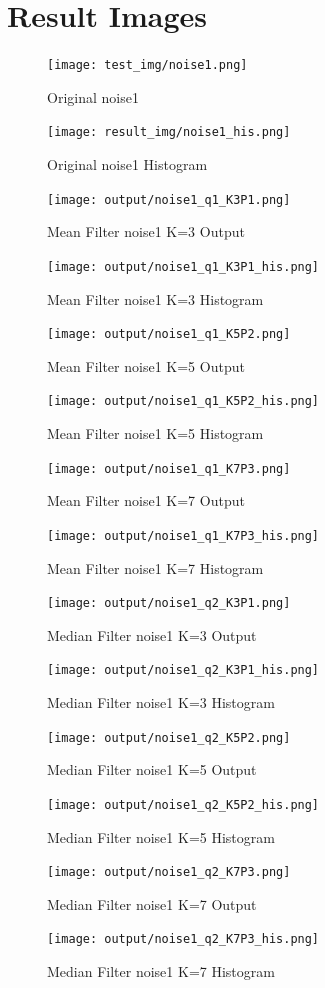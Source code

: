 \documentclass[12pt,a4paper]{report}
\begin{document}
\chapter{Result Images}
\begin{figure}[!htb]
  \centering
  \texttt{[image: test\_img/noise1.png]}
  \caption{Original noise1}
  \texttt{[image: result\_img/noise1\_his.png]}
  \caption{Original noise1 Histogram}
\end{figure}
\begin{figure}[!htb]
  \texttt{[image: output/noise1\_q1\_K3P1.png]}
  \caption{Mean Filter noise1 K=3 Output}
  \texttt{[image: output/noise1\_q1\_K3P1\_his.png]}
  \caption{Mean Filter noise1 K=3 Histogram}
\end{figure}
\begin{figure}[!htb]
  \texttt{[image: output/noise1\_q1\_K5P2.png]}
  \caption{Mean Filter noise1 K=5 Output}
  \texttt{[image: output/noise1\_q1\_K5P2\_his.png]}
  \caption{Mean Filter noise1 K=5 Histogram}
\end{figure}
\begin{figure}[!htb]
  \texttt{[image: output/noise1\_q1\_K7P3.png]}
  \caption{Mean Filter noise1 K=7 Output}
  \texttt{[image: output/noise1\_q1\_K7P3\_his.png]}
  \caption{Mean Filter noise1 K=7 Histogram}
\end{figure}
\begin{figure}[!htb]
  \texttt{[image: output/noise1\_q2\_K3P1.png]}
  \caption{Median Filter noise1 K=3 Output}
  \texttt{[image: output/noise1\_q2\_K3P1\_his.png]}
  \caption{Median Filter noise1 K=3 Histogram}
\end{figure}
\begin{figure}[!htb]
  \texttt{[image: output/noise1\_q2\_K5P2.png]}
  \caption{Median Filter noise1 K=5 Output}
  \texttt{[image: output/noise1\_q2\_K5P2\_his.png]}
  \caption{Median Filter noise1 K=5 Histogram}
\end{figure}
\begin{figure}[!htb]
  \texttt{[image: output/noise1\_q2\_K7P3.png]}
  \caption{Median Filter noise1 K=7 Output}
  \texttt{[image: output/noise1\_q2\_K7P3\_his.png]}
  \caption{Median Filter noise1 K=7 Histogram}
\end{figure}
\end{document}
